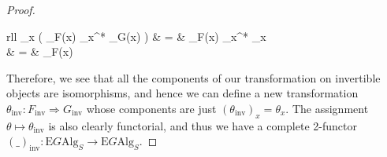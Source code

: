 \begin{proof}
\begin{eq*}
\begin{array}{rll}
		\theta_x \circ  \big( _{F(x)} \otimes \theta_{x^*} \otimes {}_{G(x)} \big) & = & _{F(x)} \otimes \theta_{x^*} \otimes \theta_x \\
		& = &  _{F(x)} \\
		\end{array} 
\end{eq*}
Therefore, we see that all the components of our transformation on invertible objects are isomorphisms, and hence we can define a new transformation $\theta_{\mathrm{inv}}: F_{\mathrm{inv}} \Rightarrow G_{\mathrm{inv}}$ whose components are just $(\theta_{\mathrm{inv}})_x = \theta_x$. The assignment $\theta \mapsto \theta_{\mathrm{inv}}$ is also clearly functorial, and thus we have a complete 2-functor $(\_)_{\mathrm{inv}}: \mathrm{E}G\mathrm{Alg}_S \to \mathrm{E}G\mathrm{Alg}_S$.
\end{proof}

